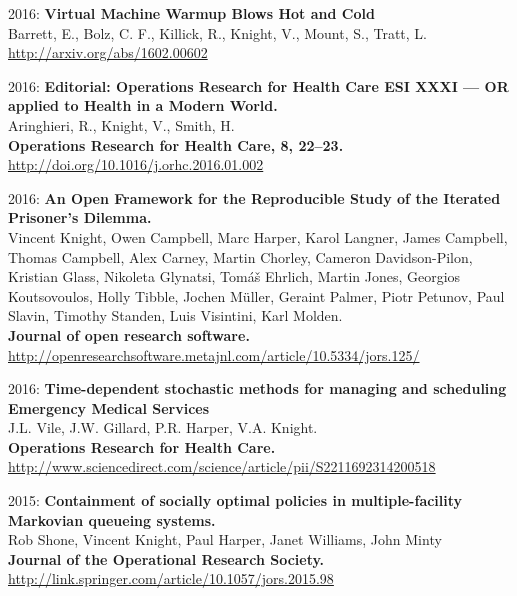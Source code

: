 \documentclass[10pt]{res} %
\begin{document}
\begin{resume}
\begin{etaremune}
\item
2016: \textbf{Virtual Machine Warmup Blows Hot and Cold}\\
Barrett, E., Bolz, C. F., Killick, R., Knight, V., Mount, S., Tratt, L.
\\
\url{http://arxiv.org/abs/1602.00602}
\\

\item
2016: \textbf{Editorial: Operations Research for Health Care ESI XXXI — OR applied to Health in a Modern World.}\\
Aringhieri, R., Knight, V., Smith, H.
\\
\textbf{Operations Research for Health Care, 8, 22–23.}
\\
\url{http://doi.org/10.1016/j.orhc.2016.01.002}
\\

\item
2016: \textbf{An Open Framework for the Reproducible Study of the Iterated Prisoner’s Dilemma.}\\
Vincent Knight, Owen Campbell, Marc Harper, Karol Langner, James Campbell, Thomas Campbell, Alex Carney, Martin Chorley, Cameron Davidson-Pilon, Kristian Glass, Nikoleta Glynatsi, Tomáš Ehrlich, Martin Jones, Georgios Koutsovoulos, Holly Tibble, Jochen Müller, Geraint Palmer, Piotr Petunov, Paul Slavin, Timothy Standen, Luis Visintini, Karl Molden.
\\
\textbf{Journal of open research software.}
\\
\url{http://openresearchsoftware.metajnl.com/article/10.5334/jors.125/}
\\

\item
2016: \textbf{Time-dependent stochastic methods for managing and scheduling Emergency Medical Services}\\
J.L. Vile, J.W. Gillard, P.R. Harper, V.A. Knight.
\\
\textbf{Operations Research for Health Care.}
\\
\url{http://www.sciencedirect.com/science/article/pii/S2211692314200518}
\\

\item
2015: \textbf{Containment of socially optimal policies in multiple-facility Markovian queueing systems.}\\
Rob Shone, Vincent Knight, Paul Harper, Janet Williams, John Minty
\\
\textbf{Journal of the Operational Research Society.}
\\
\url{http://link.springer.com/article/10.1057/jors.2015.98}
\\


\end{etaremune}
\end{resume}
\end{document}
